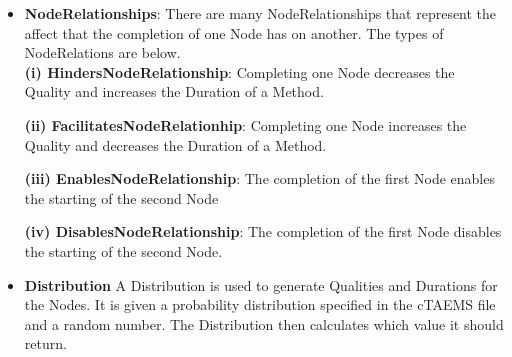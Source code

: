 \begin{enumerate}
\begin{itemize}
\item \textbf{NodeRelationships}: There are many NodeRelationships that represent the affect that the completion of one Node has on another. The types of NodeRelations are below. \\

\subitem \textbf{(i) HindersNodeRelationship}: Completing one Node decreases the Quality and increases the Duration of a Method.

\subitem \textbf{(ii) FacilitatesNodeRelationhip}: Completing one Node increases the Quality and decreases the Duration of a Method.

\subitem \textbf{(iii) EnablesNodeRelationship}: The completion of the first Node enables the starting of the second Node

\subitem \textbf{(iv) DisablesNodeRelationship}: The completion of the first Node disables the starting of the second Node.

\item \textbf{Distribution}  A Distribution is used to generate Qualities and Durations for the Nodes. It is given a probability distribution specified in the cTAEMS file and a random number. The Distribution then calculates which value it should return.


\end{itemize}
\end{enumerate}